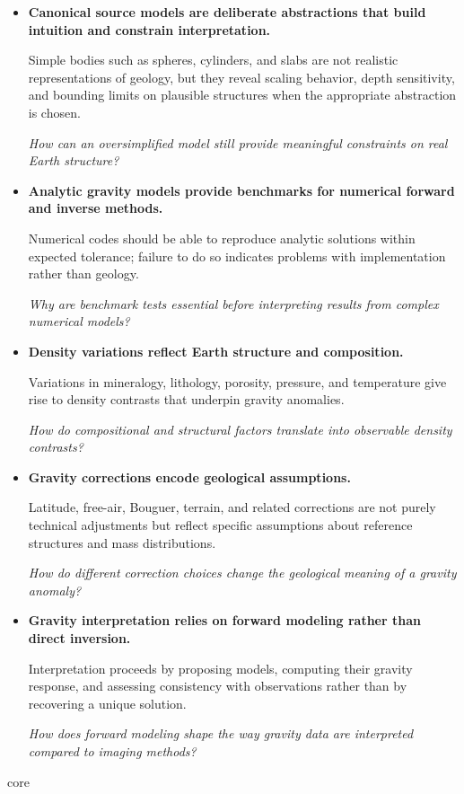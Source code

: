 {\begin{itemize}
    \item \textbf{Canonical source models are deliberate abstractions that build intuition and constrain interpretation.}

    Simple bodies such as spheres, cylinders, and slabs are not realistic representations of geology, but they reveal scaling behavior, depth sensitivity, and bounding limits on plausible structures when the appropriate abstraction is chosen.

    \textit{How can an oversimplified model still provide meaningful constraints on real Earth structure?}

    \item \textbf{Analytic gravity models provide benchmarks for numerical forward and inverse methods.}

    Numerical codes should be able to reproduce analytic solutions within expected tolerance; failure to do so indicates problems with implementation rather than geology.

    \textit{Why are benchmark tests essential before interpreting results from complex numerical models?}

    \item \textbf{Density variations reflect Earth structure and composition.}

    Variations in mineralogy, lithology, porosity, pressure, and temperature give rise to density contrasts that underpin gravity anomalies.

    \textit{How do compositional and structural factors translate into observable density contrasts?}

    \item \textbf{Gravity corrections encode geological assumptions.}

    Latitude, free-air, Bouguer, terrain, and related corrections are not purely technical adjustments but reflect specific assumptions about reference structures and mass distributions.

    \textit{How do different correction choices change the geological meaning of a gravity anomaly?}

    \item \textbf{Gravity interpretation relies on forward modeling rather than direct inversion.}

    Interpretation proceeds by proposing models, computing their gravity response, and assessing consistency with observations rather than by recovering a unique solution.

    \textit{How does forward modeling shape the way gravity data are interpreted compared to imaging methods?}
\end{itemize}
}{core}

